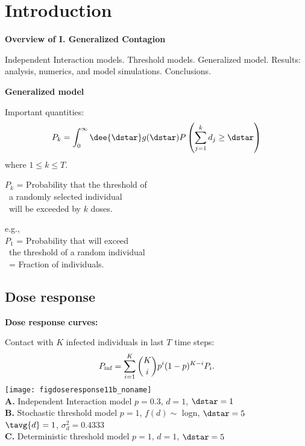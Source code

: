 \section{Introduction}

  \textbf{Overview of I. Generalized Contagion}

  
   Independent Interaction models.
   Threshold models.
   Generalized model.
   Results: analysis, numerics, and model simulations.
   Conclusions.
  



  \textbf{Generalized model}

  Important quantities:
  $$  
  P_k
  =
  \int_{0}^{\infty} \dee{\dstar}
  g(\dstar)
  P\left(
    \sum_{j=1}^{k} d_j \ge \dstar
    \right)
  $$
  where $1 \le k \le T$.

  $P_k$ = Probability that the threshold of \\
\quad \quad \  a randomly selected individual\\
\quad \quad \  will be exceeded by $k$ doses.

e.g., \\
$P_1$ = Probability that \underline{} will exceed\\
\quad \quad \ the threshold of a random individual\\
\ \quad  = Fraction of \underline{} individuals.


\subsection{Dose response}

  \textbf{Dose response curves:}

  Contact with $K$ infected individuals in last $T$ time steps:
  $$
  P_{\textnormal{inf}} 
  = \sum_{i=1}^K
  \binom{K}{i} 
  p^i (1 -p)^{K-i} P_i.
  $$
  \texttt{[image: figdoseresponse11b\_noname]}\\

  \textbf{A.} Independent Interaction model
  \hfill 
  {\small $p=0.3$, 
    $d = 1$, 
    $\dstar=1$}\\
  \smallskip
  \textbf{B.} Stochastic threshold model
  \hfill
  {\small $p=1$, 
    $f(d) \sim$ logn,
    $\dstar=5$}\\
  \mbox{}
  \hfill
  {\small $\tavg{d} = 1$, $\sigma_d^2 = 0.4333$}\\
  \smallskip
  \textbf{C.} Deterministic threshold model
  \hfill
  {\small $p=1$, 
    $d=1$,
    $\dstar=5$}



